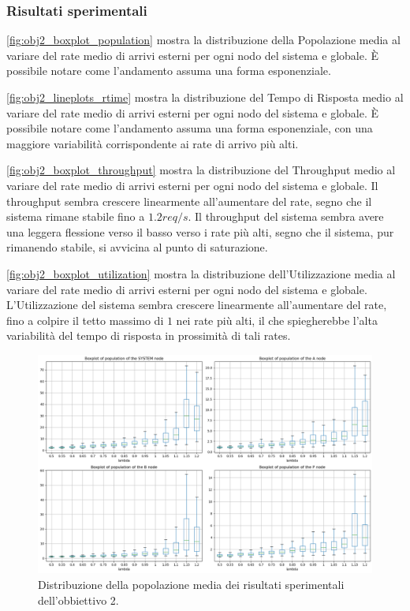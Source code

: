 \subsubsection{Risultati sperimentali}
\autoref{fig:obj2_boxplot_population} mostra la distribuzione della Popolazione media al variare del rate medio di arrivi esterni per ogni nodo del sistema e globale. È possibile notare come l'andamento assuma una forma esponenziale.

\autoref{fig:obj2_lineplots_rtime} mostra la distribuzione del Tempo di Risposta medio al variare del rate medio di arrivi esterni per ogni nodo del sistema e globale. È possibile notare come l'andamento assuma una forma esponenziale, con una maggiore variabilità corrispondente ai rate di arrivo più alti.

\autoref{fig:obj2_boxplot_throughput} mostra la distribuzione del Throughput medio al variare del rate medio di arrivi esterni per ogni nodo del sistema e globale. Il throughput sembra crescere linearmente all'aumentare del rate, segno che il sistema rimane stabile fino a $1.2 req/s$. Il throughput del sistema sembra avere una leggera flessione verso il basso verso i rate più alti, segno che il sistema, pur rimanendo stabile, si avvicina al punto di saturazione.

\autoref{fig:obj2_boxplot_utilization} mostra la distribuzione dell'Utilizzazione media al variare del rate medio di arrivi esterni per ogni nodo del sistema e globale. L'Utilizzazione del sistema sembra crescere linearmente all'aumentare del rate, fino a colpire il tetto massimo di $1$ nei rate più alti, il che spiegherebbe l'alta variabilità del tempo di risposta in prossimità di tali rates.

\begin{figure}
    \centering
    \includegraphics[width=1\linewidth]{figs//results/obj2/simulation/obj2_boxplot_population.png}
    \caption{Distribuzione della popolazione media dei risultati sperimentali dell'obbiettivo 2.}
    \label{fig:obj2_boxplot_population}
\end{figure}


